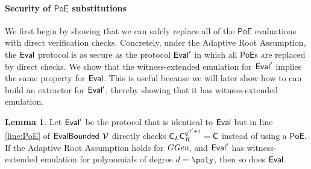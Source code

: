 \documentclass{article}
\theoremstyle{definition}
\newtheorem{lemma}{Lemma}
\begin{document}
\paragraph{Security of $\textsf{PoE}$ substitutions}
We first begin by showing that we can safely replace all of the $\textsf{PoE}$ evaluations with direct verification checks. Concretely, under the Adaptive Root Assumption, the $\textsf{{Eval}}$ protocol is as secure as the protocol $\textsf{{Eval}}'$ in which all $\textsf{PoE}$s are replaced by direct checks. We show that the witness-extended emulation for $\textsf{{Eval}}'$ implies the same property for $\textsf{{Eval}}$. This is useful because we will later show how to can build an extractor for $\textsf{{Eval}}'$, thereby showing that it has witness-extended emulation.
\begin{lemma} \label{lemma:poe_security}
Let $\textsf{{Eval}}'$ be the protocol that is identical to $\textsf{{Eval}}$ but in line \ref{line:PoE} of $\textsf{{EvalBounded}}$ $\mathcal{V}$ directly checks $\mathsf{C}_L\mathsf{C}_R^{q^{d'+1}}=\mathsf{C}$ instead of using a $\textsf{PoE}$. If the Adaptive Root Assumption holds for $\textit{GGen}$, and $\textsf{{Eval}}'$ has witness-extended emulation for polynomials of degree $d=\poly$, then so does $\textsf{{Eval}}$.
\end{lemma}
\end{document}
